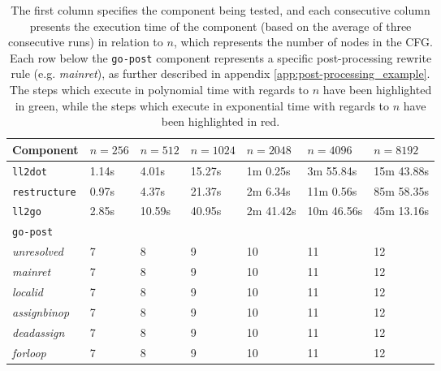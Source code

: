 \begin{table}[htbp]
	\begin{center}
		\begin{tabular}{|l|l|l|l|l|l|l|}
			\hline
			Component & $ n = 256 $ & $ n = 512 $ & $ n = 1024 $ & $ n = 2048 $ & $ n = 4096 $ & $ n = 8192 $ \\
			\hline
			\rowcolor{light_green_3}
			\texttt{ll2dot} & 1.14s & 4.01s & 15.27s & 1m 0.25s & 3m 55.84s & 15m 43.88s \\
			\rowcolor{light_green_3}
			\texttt{restructure} & 0.97s & 4.37s & 21.37s & 2m 6.34s & 11m 0.56s & 85m 58.35s \\
			\rowcolor{light_green_3}
			\texttt{ll2go} & 2.85s & 10.59s & 40.95s & 2m 41.42s & 10m 46.56s & 45m 13.16s \\
			\hline
			\multicolumn{7}{|l|}{\texttt{go-post}} \\
			\hline
			\rowcolor{light_green_3}
			\textit{unresolved} & 7 & 8 & 9 & 10 & 11 & 12 \\
			\rowcolor{light_green_3}
			\textit{mainret} & 7 & 8 & 9 & 10 & 11 & 12 \\
			\rowcolor{light_red_3}
			\textit{localid} & 7 & 8 & 9 & 10 & 11 & 12 \\
			\rowcolor{light_green_3}
			\textit{assignbinop} & 7 & 8 & 9 & 10 & 11 & 12 \\
			\rowcolor{light_green_3}
			\textit{deadassign} & 7 & 8 & 9 & 10 & 11 & 12 \\
			\rowcolor{light_green_3}
			\textit{forloop} & 7 & 8 & 9 & 10 & 11 & 12 \\
			\hline
		\end{tabular}
	\end{center}
	\caption{The first column specifies the component being tested, and each consecutive column presents the execution time of the component (based on the average of three consecutive runs) in relation to $ n $, which represents the number of nodes in the CFG. Each row below the \texttt{go-post} component represents a specific post-processing rewrite rule (e.g. \textit{mainret}), as further described in appendix \ref{app:post-processing_example}. The steps which execute in polynomial time with regards to $ n $ have been highlighted in green, while the steps which execute in exponential time with regards to $ n $ have been highlighted in red.}
	\label{tbl:run_time_summary}
\end{table}

